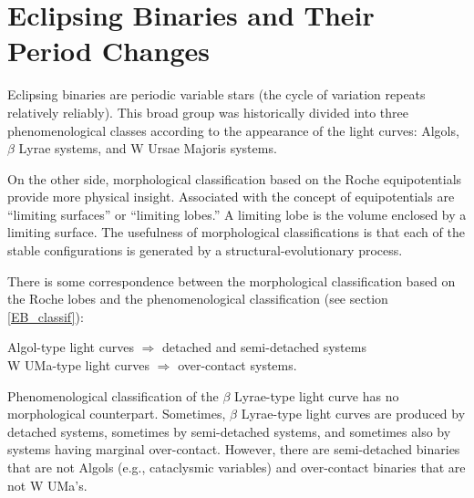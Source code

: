 \chapter{Eclipsing Binaries and Their Period Changes} %
\label{ch:EB} %

\newcommand{\keyword}[1]{\textbf{#1}}
\newcommand{\tabhead}[1]{\textbf{#1}}
\newcommand{\code}[1]{\texttt{#1}}
\newcommand{\file}[1]{\texttt{\bfseries#1}}
\newcommand{\option}[1]{\texttt{\itshape#1}}

Eclipsing binaries are periodic variable stars (the cycle of variation repeats relatively reliably). 
This broad group was historically divided into three phenomenological
classes according to the appearance of the light curves: Algols, $\beta$ Lyrae systems, and W Ursae Majoris systems.
 
On the other side, morphological classification based on the Roche equipotentials provide more physical insight. Associated with the
concept of equipotentials are “limiting surfaces” or “limiting lobes.” A limiting
lobe is the volume enclosed by a limiting surface. The usefulness of morphological
classifications is that each of the stable configurations is generated by a structural-evolutionary process.

There is some correspondence between the morphological classification based on
the Roche lobes and the phenomenological classification (see section \ref{EB_classif}):
\begin{center}
Algol-type light curves $\Rightarrow$ detached and semi-detached systems\\
W UMa-type light curves $\Rightarrow$ over-contact systems.\\
\end{center}

Phenomenological classification of the $\beta$ Lyrae-type light curve has
no morphological counterpart. Sometimes, $\beta$ Lyrae-type light curves are produced
by detached systems, sometimes by semi-detached systems, and sometimes also by
systems having marginal over-contact. However, there are semi-detached binaries that are not
Algols (e.g., cataclysmic variables) and over-contact binaries that are not W UMa’s.

